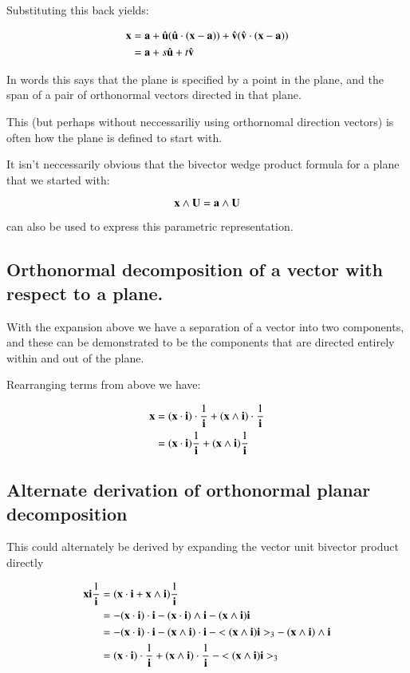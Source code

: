 \documentclass{article}
\begin{document}
Substituting this back yields:

\begin{align*}
\mathbf{x} 
&= \mathbf{a} + \hat{\mathbf{u}} (\hat{\mathbf{u}} \cdot (\mathbf{x} - \mathbf{a})) + \hat{\mathbf{v}} (\hat{\mathbf{v}} \cdot (\mathbf{x} - \mathbf{a})) \\
&= \mathbf{a} + s \hat{\mathbf{u}} + t \hat{\mathbf{v}}
\end{align*}

In words this says that the plane is specified by a point in the plane,
and the span
of a pair of orthonormal vectors directed in that plane.

This (but perhaps without neccessariliy using orthornomal direction vectors)
is often how the plane is defined to start with.

It isn't neccessarily obvious that the bivector wedge product formula for
a plane that we started with:

\[
\mathbf{x} \wedge \mathbf{U} = \mathbf{a} \wedge \mathbf{U}
\]

can also be used to express this parametric representation.

\subsection{ Orthonormal decomposition of a vector with respect to a plane. }

With the expansion above we have a separation of a vector into two
components, and these can be demonstrated to be the components that are
directed entirely within and out of the plane.

Rearranging terms from above we have:

\begin{align*}
\mathbf{x} 
&= 
(\mathbf{x} \cdot \mathbf{i}) \cdot \frac{1}{\mathbf{i}} + (\mathbf{x} \wedge \mathbf{i}) \cdot \frac{1}{\mathbf{i}} \\
&= 
(\mathbf{x} \cdot \mathbf{i}) \frac{1}{\mathbf{i}} + (\mathbf{x} \wedge \mathbf{i}) \frac{1}{\mathbf{i}} \\
\end{align*}


\subsection{ Alternate derivation of orthonormal planar decomposition }

This could alternately be derived by expanding the vector unit bivector
product directly

\begin{align*}
\mathbf{x} \mathbf{i} \frac{1}{\mathbf{i}} 
&= ( \mathbf{x} \cdot \mathbf{i} + \mathbf{x} \wedge \mathbf{i} ) \frac{1}{\mathbf{i}} \\
&= 
- {(\mathbf{x} \cdot \mathbf{i}) \cdot \mathbf{i}} - {(\mathbf{x} \cdot \mathbf{i}) \wedge \mathbf{i}} - {(\mathbf{x} \wedge \mathbf{i}) \mathbf{i}} \\
&= 
- {(\mathbf{x} \cdot \mathbf{i}) \cdot \mathbf{i}} - {(\mathbf{x} \wedge \mathbf{i}) \cdot \mathbf{i} } - {<(\mathbf{x} \wedge \mathbf{i}) \mathbf{i}>_3} - {(\mathbf{x} \wedge \mathbf{i}) \wedge \mathbf{i}} \\
&= 
{(\mathbf{x} \cdot \mathbf{i}) \cdot \frac{1}{\mathbf{i}}} + {(\mathbf{x} \wedge \mathbf{i}) \cdot \frac{1}{\mathbf{i}}} - {<(\mathbf{x} \wedge \mathbf{i}) \mathbf{i}>_3} \\
\end{align*}
\end{document}
